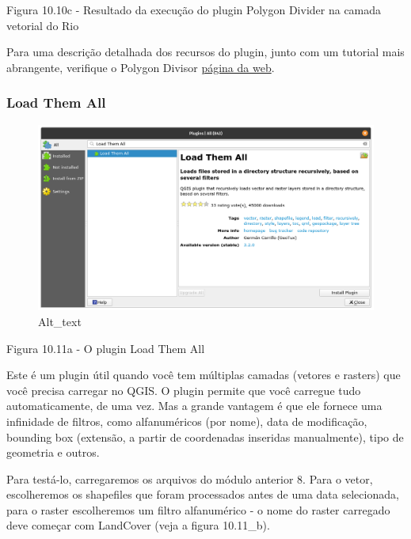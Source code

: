 \documentclass[
]{book}
\begin{document}
Figura 10.10c - Resultado da execução do plugin Polygon Divider na camada vetorial do Rio

Para uma descrição detalhada dos recursos do plugin, junto com um tutorial mais abrangente, verifique o Polygon Divisor \href{https://github.com/jonnyhuck/RFCL-PolygonDivider}{página da web}.

\hypertarget{load-them-all}{%
\subsubsection{\texorpdfstring{\textbf{Load Them All}}{Load Them All}}\label{load-them-all}}

\begin{figure}
\centering
\includegraphics{media/modulo10/fig1011_a.png}
\caption{Alt\_text}
\end{figure}

Figura 10.11a - O plugin Load Them All

Este é um plugin útil quando você tem múltiplas camadas (vetores e rasters) que você precisa carregar no QGIS. O plugin permite que você carregue tudo automaticamente, de uma vez. Mas a grande vantagem é que ele fornece uma infinidade de filtros, como alfanuméricos (por nome), data de modificação, bounding box (extensão, a partir de coordenadas inseridas manualmente), tipo de geometria e outros.

Para testá-lo, carregaremos os arquivos do módulo anterior 8. Para o vetor, escolheremos os shapefiles que foram processados \hspace{0pt}\hspace{0pt}antes de uma data selecionada, para o raster escolheremos um filtro alfanumérico - o nome do raster carregado deve começar com LandCover (veja a figura 10.11\_b).
\end{document}
